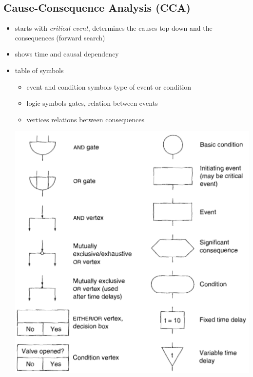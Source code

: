 \documentclass[a4paper, 10pt]{article}
\begin{document}
\subsection*{Cause-Consequence Analysis (CCA)}
\begin{itemize}
    \item starts with \emph{critical event}, determines the causes top-down and the consequences (forward search)
    \item shows time and causal dependency
    \item table of symbols
    \begin{itemize}
        \item event and condition symbols \follows type of event or condition
        \item logic symbols \follows gates, relation between events
        \item vertices \follows relations between consequences
    \end{itemize}
    \begin{center}
    \includegraphics[width=\linewidth]{images/ccaTable.png}
    \end{center}
\end{itemize}
\end{document}
